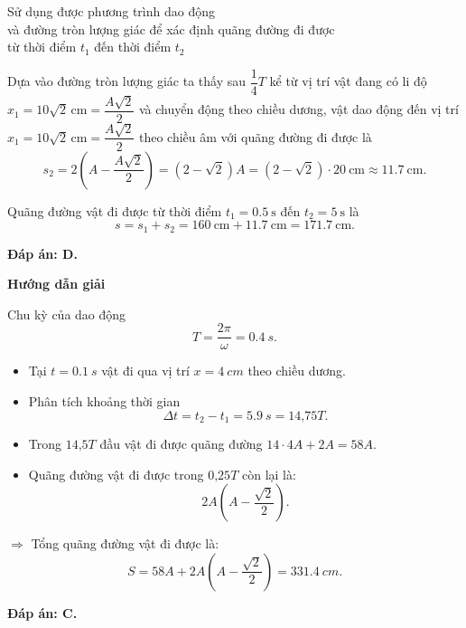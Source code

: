 \begin{dang}{Sử dụng được phương trình dao động\\ và đường tròn lượng giác để xác định quãng đường đi được\\ từ thời điểm $t_1$ đến thời điểm $t_2$}
{		Dựa vào đường tròn lượng giác ta thấy sau $\dfrac{1}{4}T$ kể từ vị trí vật đang có li độ $x_1=10\sqrt{2}\,\text{cm}=\dfrac{A\sqrt{2}}{2}$ và chuyển động theo chiều dương, vật dao động đến vị trí  $x_1=10\sqrt{2}\,\text{cm}=\dfrac{A\sqrt{2}}{2}$ theo chiều âm với quãng đường đi được là
		\begin{equation*}
			s_2=2\left( A-\dfrac{A\sqrt{2}}{2}\right) =(2-\sqrt{2})A=(2-\sqrt{2})\cdot\SI{20}{\centi\meter}\approx\SI{11,7}{\centi\meter}.
		\end{equation*}
		
		Quãng đường vật đi được từ thời điểm $t_1=\SI{0,5}{\second}$ đến $t_2=\SI{5}{\second}$ là
		\begin{equation*}
			s=s_1+s_2=\SI{160}{\centi\meter}+ \SI{11,7}{\centi\meter}=\SI{171,7}{\centi\meter}.
		\end{equation*}
		
		\textbf{Đáp án: D.}
	}
	
	{\begin{center}
			\textbf{Hướng dẫn giải}
		\end{center}
		
		Chu kỳ của dao động 
		\begin{equation*}
			T=\dfrac{2\pi}{\omega} = \SI{0,4}{s}.
		\end{equation*}
		\begin{itemize}
			\item Tại $t=\SI{0,1}{s}$ vật đi qua vị trí $x=\SI{4}{cm}$ theo chiều dương.
			\item Phân tích khoảng thời gian 
			\begin{equation*}
				\Delta t =t_2 -t_1  =\SI{5,9}{s}= \text{14,75}T.
			\end{equation*}
			\item Trong $\text{14,5}T$ đầu vật đi được quãng đường $14\cdot 4A +2A =58A$.
			\item Quãng đường vật đi được trong $\text{0,25}T$ còn lại là: 
			\begin{equation*}
				2A\left(A-\dfrac{\sqrt 2}{2}\right).
			\end{equation*}
		\end{itemize}
		$\Rightarrow$ Tổng quãng đường vật đi được là:
		\begin{equation*}
			S =58A + 2A\left(A-\dfrac{\sqrt 2}{2}\right) = \SI{331,4}{cm}.
		\end{equation*}
		
		\textbf{Đáp án: C.}
	}
\end{dang}

